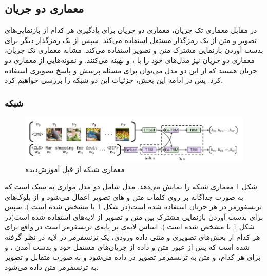 \subsection[معماری دو جریان]{معماری دو جریان}
در مقابل معماری تک جریان، معماری‌ دو جریان برای یادگیری  هر کدام از بازنمایی‌های تصویر و متن از یک رمزگذار مستقل استفاده می‌کند. سپس از یک رمزگذار دیگر برای بدست آوردن بازنمایی مشترک متن و تصویر استفاده می‌کند. مشابه معماری تک جریان، معماری‌ دو جریان نیز مدل‌های خود را با
	،
	و 
	بهینه می‌کنند. 
	\cite{lu2019vilbert}
	 و
	\cite{tan2019lxmert}
  نمونه‌هایی از معماری دو جریان هستند که از این دو مدل می‌توان برای مسئله پرسش و پاسخ تصویری استفاده کرد. پس در ادامه این بخش، جزئیات این دو شبکه را بررسی خواهیم کرد.
 
\subsubsection{شبکه }
	\begin{figure}
	 	\centerline{\includegraphics[scale=0.6]{images/VilBERT.JPG}}
	 	\caption[معماری شبکه از قبل آموزش‌دیده]{معماری شبکه از قبل آموزش‌دیده\cite{lu2019vilbert}}
	 	\label{fig:ViLBERT}
	\end{figure}
	
	شکل
	\ref{fig:ViLBERT}
	معماری شبکه 
	را نمایش می‌دهد. مدل 
	شامل دو مدل موازی به سبک
	است که به صورت جداگانه بر روی کلمات متن و 
	های تصویر اعمال می‌شود و از بلوک‌های ترنسفورمر در هر جریان استفاده شده است(در شکل 
	\ref{fig:ViLBERT}
	با 
	مشخص شده است.). سپس برای بدست آوردن بازنمایی مشترک بین متن و تصویر از لایه‌های 
	استفاده شده است(در شکل 
	\ref{fig:ViLBERT}
	با 
	مشخص شده است.). اساس لایه‌ی 
    بر پایه‌ی ترنسفرمر است در واقع برای هر کدام از بخش‌های تصویری و متنی داده ورودی، یک ترنسفرمر در لایه 
    در نظر گرفته شده است که پس از عبور متن و داده از جریان‌های مستقل خود و بدست آمدن 
	،
	و
	برای هر کدام، 
	و
	متن به ترنسفرمر تصویر در 
	داده می‌شود و به صورت متقابل
	و
	تصویر به ترنسفرمر متن داده می‌شود. 
	
